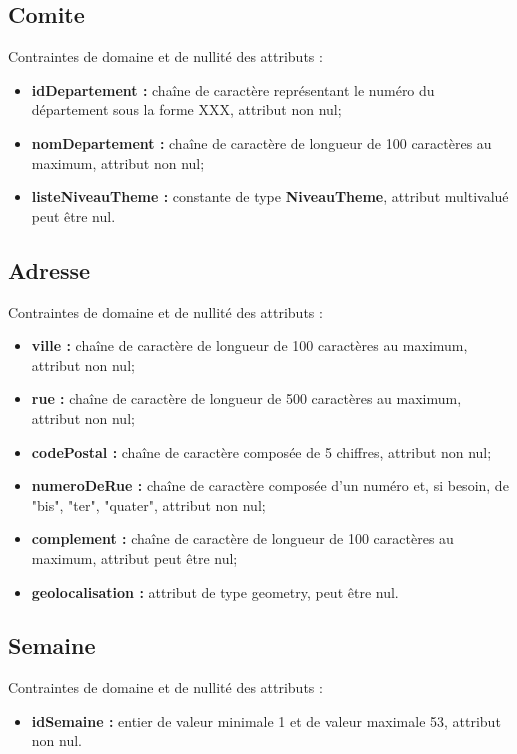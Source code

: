 \documentclass[asi, sansVersion]{picInsa}
\begin{document}
\subsection*{Comite}
Contraintes de domaine et de nullité des attributs :
\begin{itemize}
	\item \textbf{idDepartement :} chaîne de caractère représentant le numéro du département sous la forme XXX, attribut non nul;
	\item \textbf{nomDepartement :} chaîne de caractère de longueur de 100 caractères au maximum, attribut non nul;
	\item \textbf{listeNiveauTheme :} constante de type \textbf{NiveauTheme}, attribut multivalué peut être nul. \\
\end{itemize}



\subsection*{Adresse}
Contraintes de domaine et de nullité des attributs :
\begin{itemize}
 	\item \textbf{ville :} chaîne de caractère de longueur de 100 caractères au maximum, attribut non nul;
	\item \textbf{rue :} chaîne de caractère de longueur de 500 caractères au maximum, attribut non nul;
	\item \textbf{codePostal :} chaîne de caractère composée de 5 chiffres, attribut non nul;
	\item \textbf{numeroDeRue :} chaîne de caractère composée d'un numéro et, si besoin, de "bis", "ter", "quater", attribut non nul; 
	\item \textbf{complement : } chaîne de caractère de longueur de 100 caractères au maximum, attribut peut être nul;
	\item \textbf{geolocalisation : } attribut de type geometry, peut être nul.\\
\end{itemize}

\subsection*{Semaine}
Contraintes de domaine et de nullité des attributs : 
\begin{itemize}
	\item \textbf{idSemaine :} entier de valeur minimale 1 et de valeur maximale 53, attribut non nul.
\end{itemize}
\end{document}
